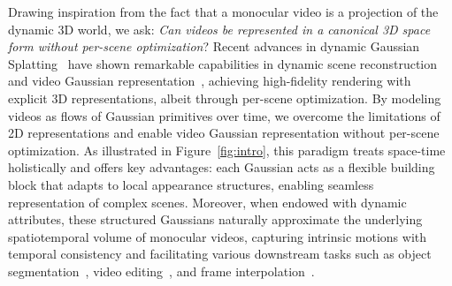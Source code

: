 Drawing inspiration from the fact that a monocular video is a projection of the dynamic 3D world, we ask: \textit{Can videos be represented in a canonical 3D space form without per-scene optimization}? Recent advances in dynamic Gaussian Splatting~\cite{kerbl20233d} have shown remarkable capabilities in dynamic scene reconstruction~\cite{yang2024deformable, wu20244d, duan20244d} and video Gaussian representation~\cite{sun2024splatter, wang2024gflow, lei2024mosca}, achieving high-fidelity rendering with explicit 3D representations, albeit through per-scene optimization.
%
By modeling videos as flows of Gaussian primitives over time, we overcome the limitations of 2D representations and enable video Gaussian representation without per-scene optimization. As illustrated in Figure~\ref{fig:intro}, this paradigm treats space-time holistically and offers key advantages: each Gaussian acts as a flexible building block that adapts to local appearance structures, enabling seamless representation of complex scenes. Moreover, when endowed with dynamic attributes, these structured Gaussians naturally approximate the underlying spatiotemporal volume of monocular videos, capturing intrinsic motions with temporal consistency and facilitating various downstream tasks such as object segmentation~\cite{flashsplat, sun2024splatter}, video editing~\cite{ceylan2023pix2video, qi2023fatezero}, and frame interpolation~\cite{dong2023video, lu2022video}.


%



